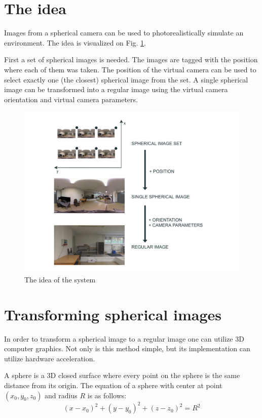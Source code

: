\documentclass{svproc}
\begin{document}
\section{The idea}

Images from a spherical camera can be used to photorealistically simulate an environment.
The idea is visualized on Fig. \ref{fig:flow}.

First a set of spherical images is needed.
The images are tagged with the position where each of them was taken.
The position of the virtual camera can be used to select exactly one (the closest) spherical image from the set.
A single spherical image can be transformed into a regular image using the virtual camera orientation and virtual camera parameters.
\begin{figure}[!ht]
    \includegraphics[width=\textwidth]{img/drawio/flow.pdf}
    \caption{The idea of the system}
    \label{fig:flow}
\end{figure}

\section{Transforming spherical images}

In order to transform a spherical image to a regular image one can utilize 3D computer graphics.
Not only is this method simple, but its implementation can utilize hardware acceleration.

A sphere is a 3D closed surface where every point on the sphere is the same distance from its origin.
The equation of a sphere with center at point $(x_0, y_0, z_0)$ and radius $R$ is as follows:
\begin{equation}
    (x - x_0)^2 + (y - y_0)^2 + (z - z_0)^2 = R^2
\end{equation}
\end{document}
